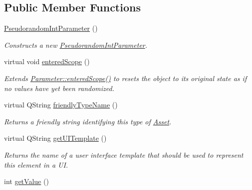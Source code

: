 \subsection*{Public Member Functions}
\begin{DoxyCompactItemize}
\item 
\hyperlink{class_picto_1_1_pseudorandom_int_parameter_af274287253d96fd956226765de22335a}{Pseudorandom\-Int\-Parameter} ()
\begin{DoxyCompactList}\small\item\em Constructs a new \hyperlink{class_picto_1_1_pseudorandom_int_parameter}{Pseudorandom\-Int\-Parameter}. \end{DoxyCompactList}\item 
\hypertarget{class_picto_1_1_pseudorandom_int_parameter_ac1aaae1360c780b8677e9e026fec766e}{virtual void \hyperlink{class_picto_1_1_pseudorandom_int_parameter_ac1aaae1360c780b8677e9e026fec766e}{entered\-Scope} ()}\label{class_picto_1_1_pseudorandom_int_parameter_ac1aaae1360c780b8677e9e026fec766e}

\begin{DoxyCompactList}\small\item\em Extends \hyperlink{class_picto_1_1_scriptable_ad1945e93d9ebf6cb1f1b8d0a400b73c5}{Parameter\-::entered\-Scope()} to resets the object to its original state as if no values have yet been randomized. \end{DoxyCompactList}\item 
virtual Q\-String \hyperlink{class_picto_1_1_pseudorandom_int_parameter_a774a526380ae8a78827c2ecd8206d15c}{friendly\-Type\-Name} ()
\begin{DoxyCompactList}\small\item\em Returns a friendly string identifying this type of \hyperlink{class_picto_1_1_asset}{Asset}. \end{DoxyCompactList}\item 
\hypertarget{class_picto_1_1_pseudorandom_int_parameter_a1eadd3d219540dce999a43fd96bdc19a}{virtual Q\-String \hyperlink{class_picto_1_1_pseudorandom_int_parameter_a1eadd3d219540dce999a43fd96bdc19a}{get\-U\-I\-Template} ()}\label{class_picto_1_1_pseudorandom_int_parameter_a1eadd3d219540dce999a43fd96bdc19a}

\begin{DoxyCompactList}\small\item\em Returns the name of a user interface template that should be used to represent this element in a U\-I. \end{DoxyCompactList}\item 
\hypertarget{class_picto_1_1_pseudorandom_int_parameter_a7b6dcbd8ef6f097360cbd36a65be9196}{int \hyperlink{class_picto_1_1_pseudorandom_int_parameter_a7b6dcbd8ef6f097360cbd36a65be9196}{get\-Value} ()}\label{class_picto_1_1_pseudorandom_int_parameter_a7b6dcbd8ef6f097360cbd36a65be9196}


\end{DoxyCompactItemize}
